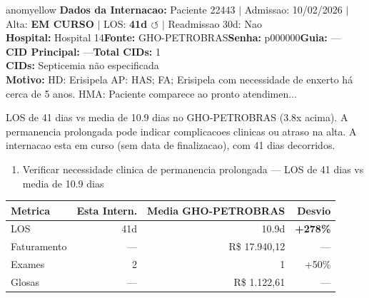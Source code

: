 \documentclass[a4paper,10pt]{article}
\begin{document}
\begin{anomalycard}[Internacao 165095 | GHO-PETROBRAS | MODERADO (z=2.17)]{anomyellow}
\textbf{Dados da Internacao:} Paciente 22443 $\mid$ Admissao: 10/02/2026 $\mid$ Alta: \textcolor{anomorange}{\textbf{EM CURSO}} $\mid$ LOS: \textbf{41d \textcolor{anomorange}{$\circlearrowleft$}} $\mid$ Readmissao 30d: Nao\\
\textbf{Hospital:} Hospital 14\quad\textbf{Fonte:} GHO-PETROBRAS\quad\textbf{Senha:} p000000\quad\textbf{Guia:} ---\\
\textbf{CID Principal:} {\small ---}\quad\textbf{Total CIDs:} 1\\

\textbf{CIDs:} {\scriptsize Septicemia não especificada}\\

\textbf{Motivo:} {\scriptsize HD: Erisipela AP: HAS; FA; Erisipela com necessidade de enxerto há cerca de 5 anos.  HMA: Paciente comparece ao pronto atendimen...}\\

\vspace{2pt}\begin{tcolorbox}[colback=severityred!20,colframe=anomyellow,title={\textbf{Interpretacao de Negocio}},fonttitle=\bfseries\small,left=4pt,right=4pt,top=3pt,bottom=3pt]
{\small LOS de 41 dias vs media de 10.9 dias no GHO-PETROBRAS (3.8x acima). A permanencia prolongada pode indicar complicacoes clinicas ou atraso na alta. A internacao esta em curso (sem data de finalizacao), com 41 dias decorridos.}
\end{tcolorbox}
\begin{tcolorbox}[colback=severityyellow!30,colframe=anomorange,title={\textbf{Recomendacoes Especificas}},fonttitle=\bfseries\small,left=4pt,right=4pt,top=3pt,bottom=3pt]
\begin{enumerate}[nosep,leftmargin=16pt]
\item {\small Verificar necessidade clinica de permanencia prolongada --- LOS de 41 dias vs media de 10.9 dias}
\end{enumerate}
\end{tcolorbox}
\begin{center}\begin{tabular}{l r r r}\toprule\textbf{Metrica} & \textbf{Esta Intern.} & \textbf{Media GHO-PETROBRAS} & \textbf{Desvio} \\\midrule
LOS & 41d & 10.9d & \textcolor{anomred}{\textbf{+278\%}} \\
Faturamento & --- & R\$ 17.940,12 & --- \\
Exames & 2 & 1 & \textcolor{anomorange}{+50\%} \\
Glosas & --- & R\$ 1.122,61 & --- \\
\bottomrule\end{tabular}\end{center}


\end{anomalycard}
\end{document}
